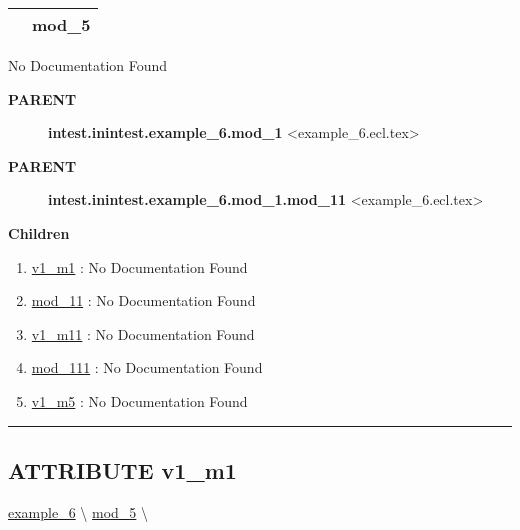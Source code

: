 {\renewcommand{\arraystretch}{1.5}
\begin{tabularx}{\textwidth}{|>{\raggedright\arraybackslash}l|X|}
\hline
\hspace{0pt}\mytexttt{\color{red} } & \textbf{mod\_5} \\
\hline
\end{tabularx}
}

\par





No Documentation Found










\par
\begin{description}
\item [\colorbox{tagtype}{\color{white} \textbf{\textsf{PARENT}}}] \textbf{intest.inintest.example\_6.mod\_1} <example\_6.ecl.tex>
\item [\colorbox{tagtype}{\color{white} \textbf{\textsf{PARENT}}}] \textbf{intest.inintest.example\_6.mod\_1.mod\_11} <example\_6.ecl.tex>
\end{description}


\textbf{Children}
\begin{enumerate}
\item \hyperlink{ecldoc:intest.inintest.example_6.mod_1.v1_m1}{v1\_m1}
: No Documentation Found
\item \hyperlink{ecldoc:intest.inintest.example_6.mod_1.mod_11}{mod\_11}
: No Documentation Found
\item \hyperlink{ecldoc:intest.inintest.example_6.mod_1.mod_11.v1_m11}{v1\_m11}
: No Documentation Found
\item \hyperlink{ecldoc:intest.inintest.example_6.mod_1.mod_11.mod_111}{mod\_111}
: No Documentation Found
\item \hyperlink{ecldoc:intest.inintest.example_6.mod_5.v1_m5}{v1\_m5}
: No Documentation Found
\end{enumerate}

\rule{\linewidth}{0.5pt}

\subsection*{\textsf{\colorbox{headtoc}{\color{white} ATTRIBUTE}
v1\_m1}}

\hypertarget{ecldoc:intest.inintest.example_6.mod_1.v1_m1}{}
\hspace{0pt} \hyperlink{ecldoc:intest.inintest.example_6}{example_6} \textbackslash 
\hspace{0pt} \hyperlink{ecldoc:intest.inintest.example_6.mod_5}{mod_5} \textbackslash 

